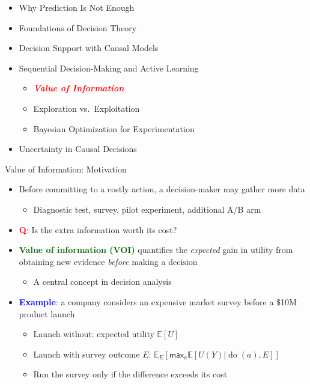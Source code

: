 \documentclass[
  10pt,
  ignorenonframetext,
]{beamer}
\providecommand{\tightlist}{%
  \setlength{\itemsep}{0pt}\setlength{\parskip}{0pt}}
\newcommand{\EE}{\mathbb{E}}
\def\max{\textsf{max}}
\begin{document}
\begin{frame}{}
\label{section-13}
\begin{itemize}
\tightlist
\item
  Why Prediction Is Not Enough
\item
  Foundations of Decision Theory
\item
  Decision Support with Causal Models
\item
  Sequential Decision-Making and Active Learning

  \begin{itemize}
  \tightlist
  \item
    \emph{\textbf{\textcolor{red}{Value of Information}}}
  \item
    Exploration vs.~Exploitation
  \item
    Bayesian Optimization for Experimentation
  \end{itemize}
\item
  Uncertainty in Causal Decisions
\end{itemize}
\end{frame}

\begin{frame}{Value of Information: Motivation}
\label{value-of-information-motivation}
\begin{itemize}
\item
  Before committing to a costly action, a decision-maker may gather more
  data

  \begin{itemize}
  \tightlist
  \item
    Diagnostic test, survey, pilot experiment, additional A/B arm
  \end{itemize}
\item
  \textbf{\textcolor{red}{Q}}: Is the extra information worth its cost?
\item
  \textbf{\textcolor{darkgreen}{Value of information (VOI)}} quantifies
  the \emph{expected} gain in utility from obtaining new evidence
  \emph{before} making a decision

  \begin{itemize}
  \tightlist
  \item
    A central concept in decision analysis
  \end{itemize}
\item
  \textbf{\textcolor{blue}{Example}}: a company considers an expensive
  market survey before a \$10M product launch

  \begin{itemize}
  \tightlist
  \item
    Launch without: expected utility \(\EE[U]\)
  \item
    Launch with survey outcome \(E\):
    \(\EE_E[\max_a \EE[U(Y) | \operatorname{do}(a), E]]\)
  \item
    Run the survey only if the difference exceeds its cost
  \end{itemize}
\end{itemize}
\end{frame}
\end{document}

